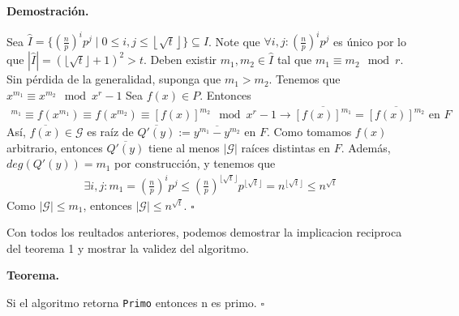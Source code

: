\documentclass{article}
\newenvironment{dem}{\par\noindent\textbf{Demostración.}\par}{\hfill$\square$\par}
\newenvironment{teo}{\par\noindent\textbf{Teorema.}\par}{\hfill$\square$\par}
\begin{document}
\begin{dem}
    Sea $\hat{I}=\{\left(\frac{n}{p}\right)^i p^j \mid 0 \leq i,j \leq \left\lfloor \sqrt{t} \right\rfloor \} \subseteq I$. Note que $\forall i,j : (\frac{n}{p})^ip^j$ es único por lo que $|\hat{I}|=(\lfloor \sqrt{t} \rfloor + 1)^2>t$. Deben existir $m_1,m_2 \in \hat{I}$ tal que $m_1 \equiv m_2 \mod r$. Sin pérdida de la generalidad, suponga que $m_1>m_2$. Tenemos que $x^{m_1} \equiv x^{m_2} \mod x^r-1$
    Sea $f(x) \in P$. Entonces 
    \begin{align}
    [f(x)]^{m_1} \equiv f(x^{m_1}) \equiv f(x^{m_2}) \equiv [f(x)]^{m_2} \mod x^r-1 \to \overline{[f(x)]^{m_1}}=\overline{[f(x)]^{m_2}} \text{ en } F
    \end{align}
    Así, $\overline{f(x)} \in \mathcal{G}$ es raíz de $\overline{Q'(y)}:=\overline{y^{m_1}-y^{m_2}}$ en $F$. Como tomamos $f(x)$ arbitrario, entonces $\overline{Q'(y)}$ tiene al menos $|\mathcal{G}|$ raíces distintas en $F$. Además, $deg(Q'(y))=m_1$ por construcción, y tenemos que  
    \begin{align}
        \exists i,j : m_1=(\frac{n}{p})^ip^j\leq (\frac{n}{p})^{\lfloor \sqrt{t} \rfloor}p^{\lfloor \sqrt{t} \rfloor}=n^{\lfloor \sqrt{t} \rfloor}\leq n^{\sqrt{t}} 
    \end{align}
    Como $|\mathcal{G}|\leq m_1$, entonces $|\mathcal{G}|\leq n^{\sqrt{t}}$. 
\end{dem}
Con todos los reultados anteriores, podemos demostrar la implicacion reciproca del teorema 1 y mostrar la validez del algoritmo.\\
\begin{teo}
    Si el algoritmo retorna \texttt{Primo} entonces n es primo.
\end{teo}
\end{document}
